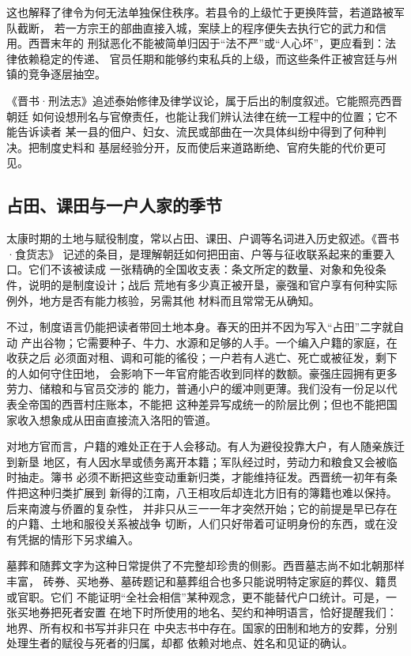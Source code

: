 这也解释了律令为何无法单独保住秩序。若县令的上级忙于更换阵营，若道路被军队截断，
若一方宗王的部曲直接入城，案牍上的程序便失去执行它的武力和信用。西晋末年的
刑狱恶化不能被简单归因于“法不严”或“人心坏”，更应看到：法律依赖稳定的传递、
官员任期和能够约束私兵的上级，而这些条件正被宫廷与州镇的竞争逐层抽空。

\begin{textwindow}
《晋书·刑法志》追述泰始修律及律学议论，属于后出的制度叙述。它能照亮西晋朝廷
如何设想刑名与官僚责任，也能让我们辨认法律在统一工程中的位置；它不能告诉读者
某一县的佃户、妇女、流民或部曲在一次具体纠纷中得到了何种判决。把制度史料和
基层经验分开，反而使后来道路断绝、官府失能的代价更可见。
\end{textwindow}

\subsection{占田、课田与一户人家的季节}

太康时期的土地与赋役制度，常以占田、课田、户调等名词进入历史叙述。《晋书·食货志》
记述的条目，是理解朝廷如何把田亩、户等与征收联系起来的重要入口。它们不该被读成
一张精确的全国收支表：条文所定的数量、对象和免役条件，说明的是制度设计；战后
荒地有多少真正被开垦，豪强和官户享有何种实际例外，地方是否有能力核验，另需其他
材料而且常常无从确知。

不过，制度语言仍能把读者带回土地本身。春天的田并不因为写入“占田”二字就自动
产出谷物；它需要种子、牛力、水源和足够的人手。一个编入户籍的家庭，在收获之后
必须面对租、调和可能的徭役；一户若有人逃亡、死亡或被征发，剩下的人如何守住田地，
会影响下一年官府能否收到同样的数额。豪强庄园拥有更多劳力、储粮和与官员交涉的
能力，普通小户的缓冲则更薄。我们没有一份足以代表全帝国的西晋村庄账本，不能把
这种差异写成统一的阶层比例；但也不能把国家收入想象成从田亩直接流入洛阳的管道。

对地方官而言，户籍的难处正在于人会移动。有人为避役投靠大户，有人随亲族迁到新垦
地区，有人因水旱或债务离开本籍；军队经过时，劳动力和粮食又会被临时抽走。簿书
必须不断把这些变动重新归类，才能维持征发。西晋统一初年有条件把这种归类扩展到
新得的江南，八王相攻后却连北方旧有的簿籍也难以保持。后来南渡与侨置的复杂性，
并非只从三一一年才突然开始；它的前提是早已存在的户籍、土地和服役关系被战争
切断，人们只好带着可证明身份的东西，或在没有凭据的情形下另求编入。

墓葬和随葬文字为这种日常提供了不完整却珍贵的侧影。西晋墓志尚不如北朝那样丰富，
砖券、买地券、墓砖题记和墓葬组合也多只能说明特定家庭的葬仪、籍贯或官职。它们
不能证明“全社会相信”某种观念，更不能替代户口统计。可是，一张买地券把死者安置
在地下时所使用的地名、契约和神明语言，恰好提醒我们：地界、所有权和书写并非只在
中央志书中存在。国家的田制和地方的安葬，分别处理生者的赋役与死者的归属，却都
依赖对地点、姓名和见证的确认。

